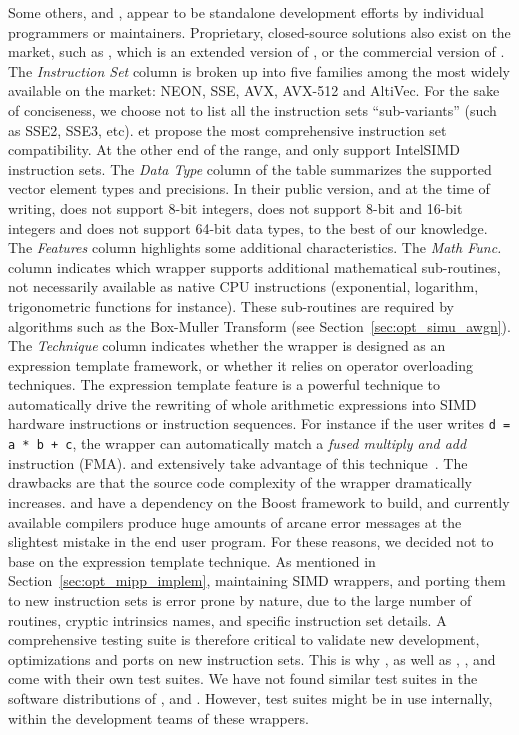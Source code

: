 Some others, \simdpp and \xsimd, appear to be standalone development efforts by
individual programmers or maintainers. Proprietary, closed-source solutions also
exist on the market, such as \bSIMD, which is an extended version of \BoostSIMD,
or the commercial version of \VCL. The \textit{Instruction Set} column is broken
up into five families among the most widely available on the market: NEON, SSE,
AVX, AVX-512 and AltiVec. For the sake of conciseness, we choose not to list all
the instruction sets ``sub-variants'' (such as SSE2, SSE3, etc). \simdpp et
\bSIMD propose the most comprehensive instruction set compatibility. At the
other end of the range, \xsimd and \BoostSIMD only support Intel\R SIMD
instruction sets. The \textit{Data Type} column of the table summarizes the
supported vector element types and precisions. In their public version, and at
the time of writing, \Vc does not support 8-bit integers, \xsimd does not
support 8-bit and 16-bit integers and \TSIMD does not support 64-bit data types,
to the best of our knowledge. The \textit{Features} column highlights some
additional characteristics. The \textit{Math Func.} column indicates which
wrapper supports additional mathematical sub-routines, not necessarily available
as native CPU instructions (exponential, logarithm, trigonometric functions for
instance). These sub-routines are required by algorithms such as the Box-Muller
Transform (see Section~\ref{sec:opt_simu_awgn}). The \textit{\Cxx Technique}
column indicates whether the wrapper is designed as an expression template
framework, or whether it relies on operator overloading techniques. The
expression template feature is a powerful technique to automatically drive the
rewriting of whole arithmetic expressions into SIMD hardware instructions or
instruction sequences. For instance if the user writes \verb|d = a * b + c|, the
wrapper can automatically match a \emph{fused multiply and add} instruction
(FMA). \BoostSIMD and \bSIMD extensively take advantage of this
technique~\cite{Esterie2012, Esterie2012a}. The drawbacks are that the source
code complexity of the wrapper dramatically increases. \BoostSIMD and \bSIMD
have a dependency on the Boost framework to build, and currently available \Cxx
compilers produce huge amounts of arcane error messages at the slightest mistake
in the end user program. For these reasons, we decided not to base \MIPP on the
expression template technique. As mentioned in
Section~\ref{sec:opt_mipp_implem}, maintaining SIMD wrappers, and porting them
to new instruction sets is error prone by nature, due to the large number of
routines, cryptic intrinsics names, and specific instruction set details. A
comprehensive testing suite is therefore critical to validate new development,
optimizations and ports on new instruction sets. This is why \MIPP, as well as
\Vc, \BoostSIMD, \simdpp and \bSIMD come with their own test suites. We have not
found similar test suites in the software distributions of \VCL, \xsimd and
\TSIMD. However, test suites might be in use internally, within the development
teams of these wrappers.

